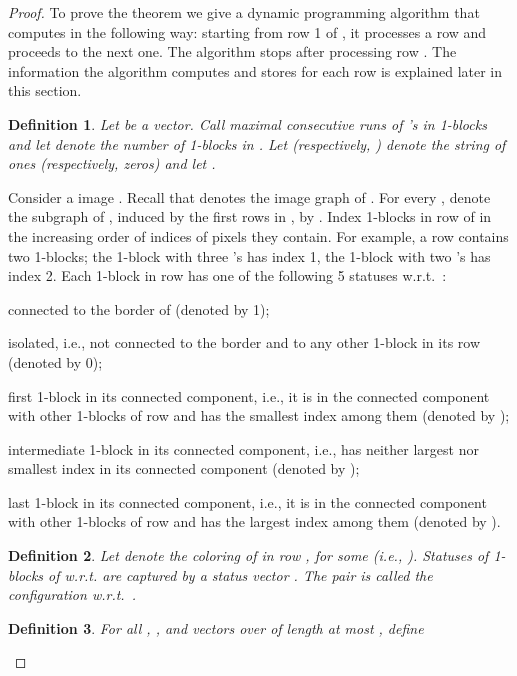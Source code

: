 \documentclass[11pt,english]{article}
\renewenvironment{itemize}[1]{\begin{compactitem}#1}{\end{compactitem}}
\newtheorem{definition}{Definition}[section]
\numberwithin{figure}{section}
\begin{document}
\begin{proof}{\color{black}
To prove the theorem we give a dynamic programming algorithm that computes  in the following way: starting from row 1 of , it processes a row and proceeds to the next one. The algorithm stops after processing row . The information the algorithm computes and stores for each row is explained later in this section.

\begin{definition}
\label{def:block}
Let  be a vector. Call maximal consecutive runs of 's in  {\em 1-blocks} and let  denote the number of 1-blocks in . Let  (respectively, ) denote the string of  ones (respectively, zeros) and let .
\end{definition}
}

Consider a  image . Recall that  denotes the image graph of . For every , denote the subgraph of , induced by the first  rows in , by . Index 1-blocks in row  of  in the increasing order of indices of pixels they contain. For example, a row  contains two 1-blocks; the 1-block with three 's  has index 1, the 1-block with two 's has index 2. Each 1-block in row  has one of the following 5 statuses w.r.t.\ :
\begin{itemize}
\item{connected to the border of  (denoted by 1);}
\item{isolated, i.e., not connected to the border and to any other 1-block in its row (denoted by 0);}
\item{first 1-block in its connected component, i.e., it is in the connected component with other 1-blocks of row  and has the smallest index among them (denoted by );}
\item{intermediate 1-block in its connected component, i.e., has neither largest nor smallest index in its connected component (denoted by );}
\item{last 1-block in its connected component, i.e., it is in the connected component with other 1-blocks of row  and has the largest index among them (denoted by ).}
\end{itemize}

{\color{black}
\begin{definition}\label{def:config}
Let  denote the coloring of  in row , for some  (i.e., ). Statuses of 1-blocks of  w.r.t.  are captured by a {\em status vector} . The pair  is called the {\em configuration w.r.t.\ .}
\end{definition}

\begin{definition}\label{def:bc-sets}
For all , , and vectors  over  of length at most , define 
\end{definition}

}
\end{proof}
\end{document}
